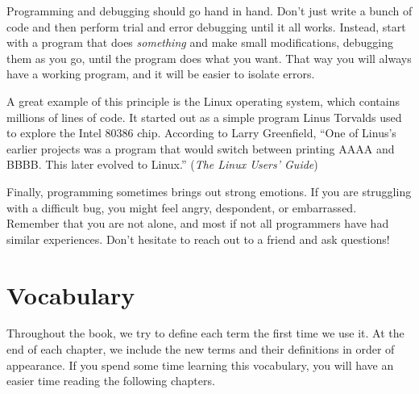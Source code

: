\documentclass[12pt]{book}
\theoremstyle{exercise}
\begin{document}
Programming and debugging should go hand in hand.
Don't just write a bunch of code and then perform trial and error debugging until it all works.
Instead, start with a program that does {\em something} and make small modifications, debugging them as you go, until the program does what you want.
That way you will always have a working program, and it will be easier to isolate errors.


A great example of this principle is the Linux operating system, which contains millions of lines of code.
It started out as a simple program Linus Torvalds used to explore the Intel 80386 chip.
According to Larry Greenfield, ``One of Linus's earlier projects was a program that would switch between printing AAAA and BBBB.
This later evolved to Linux.'' ({\it The Linux Users' Guide})


Finally, programming sometimes brings out strong emotions.
If you are struggling with a difficult bug, you might feel angry, despondent, or embarrassed.
Remember that you are not alone, and most if not all programmers have had similar experiences.
Don't hesitate to reach out to a friend and ask questions!


\section{Vocabulary}

Throughout the book, we try to define each term the first time we use it.
At the end of each chapter, we include the new terms and their definitions in order of appearance.
If you spend some time learning this vocabulary, you will have an easier time reading the following chapters.
\end{document}
